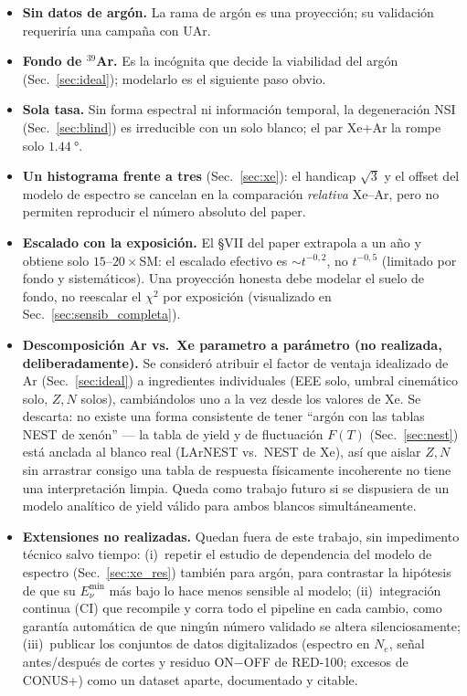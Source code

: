 \documentclass[11pt,a4paper]{article}
\newcommand{\Ne}{N_{e}}
\begin{document}
\begin{itemize}\itemsep2pt
  \item \textbf{Sin datos de arg\'on.} La rama de arg\'on es una proyecci\'on;
    su validaci\'on requerir\'ia una campa\~na con UAr.
  \item \textbf{Fondo de ${}^{39}$Ar.} Es la inc\'ognita que decide la
    viabilidad del arg\'on (Sec.~\ref{sec:ideal}); modelarlo es el siguiente paso
    obvio.
  \item \textbf{Sola tasa.} Sin forma espectral ni informaci\'on temporal, la
    degeneraci\'on NSI (Sec.~\ref{sec:blind}) es irreducible con un solo blanco;
    el par Xe+Ar la rompe solo $\SI{1.44}{\degree}$.
  \item \textbf{Un histograma frente a tres} (Sec.~\ref{sec:xe}): el handicap
    $\sqrt{3}$ y el offset del modelo de espectro se cancelan en la comparaci\'on
    \emph{relativa} Xe--Ar, pero no permiten reproducir el n\'umero absoluto del
    paper.
  \item \textbf{Escalado con la exposici\'on.} El \S VII del paper extrapola a un
    a\~no y obtiene solo $15$--$20\times$SM: el escalado efectivo es
    $\sim t^{-0{,}2}$, no $t^{-0{,}5}$ (limitado por fondo y sistem\'aticos). Una
    proyecci\'on honesta debe modelar el suelo de fondo, no reescalar el
    $\chi^{2}$ por exposici\'on (visualizado en Sec.~\ref{sec:sensib_completa}).
  \item \textbf{Descomposici\'on Ar vs.\ Xe parametro a par\'ametro (no
    realizada, deliberadamente).} Se consider\'o atribuir el factor de ventaja
    idealizado de Ar (Sec.~\ref{sec:ideal}) a ingredientes individuales
    (EEE solo, umbral cinem\'atico solo, $Z,N$ solos), cambi\'andolos uno a la
    vez desde los valores de Xe. Se descarta: no existe una forma consistente de
    tener ``arg\'on con las tablas NEST de xen\'on'' --- la tabla de yield y de
    fluctuaci\'on $F(T)$ (Sec.~\ref{sec:nest}) est\'a anclada al blanco real
    (LArNEST vs.\ NEST de Xe), as\'i que aislar $Z,N$ sin arrastrar consigo una
    tabla de respuesta f\'isicamente incoherente no tiene una interpretaci\'on
    limpia. Queda como trabajo futuro si se dispusiera de un modelo anal\'itico
    de yield v\'alido para ambos blancos simult\'aneamente.
  \item \textbf{Extensiones no realizadas.} Quedan fuera de este trabajo, sin
    impedimento t\'ecnico salvo tiempo: (i)~repetir el estudio de dependencia del
    modelo de espectro (Sec.~\ref{sec:xe_res}) tambi\'en para arg\'on, para
    contrastar la hip\'otesis de que su $E_{\nu}^{\min}$ m\'as bajo lo hace menos
    sensible al modelo; (ii)~integraci\'on continua (CI) que recompile y corra
    todo el pipeline en cada cambio, como garant\'ia autom\'atica de que ning\'un
    n\'umero validado se altera silenciosamente; (iii)~publicar los conjuntos de
    datos digitalizados (espectro en $\Ne$, se\~nal antes/despu\'es de cortes y residuo ON$-$OFF de RED-100; excesos de CONUS+) como un
    dataset aparte, documentado y citable.
\end{itemize}
\end{document}
